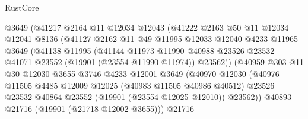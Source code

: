\begin{lexlean}{RustCore}
\begin{coremodule}
                          @3649
                          (@41217
                            @2164
                            @11
                            @12034
                            @12043
                            (@41222
                              @2163
                              @50
                              @11
                              @12034
                              @12041
                              @8136
                              (@41127
                                @2162
                                @11
                                @49
                                @11995
                                @12033
                                @12040
                                @4233
                                @11965
                                @3649
                                (@41138
                                  @11995
                                  (@41144
                                    @11973
                                    @11990
                                    @40988
                                    @23526
                                    @23532
                                    @41071
                                    @23552
                                    (@19901 (@23554 @11990 @11974))
                                    @23562))
                                (@40959
                                  @303
                                  @11
                                  @30
                                  @12030
                                  @3655
                                  @3746
                                  @4233
                                  @12001
                                  @3649
                                  (@40970
                                    @12030
                                    (@40976
                                      @11505
                                      @4485
                                      @12009
                                      @12025
                                      (@40983 @11505 @40986 @40512)
                                      @23526
                                      @23532
                                      @40864
                                      @23552
                                      (@19901 (@23554 @12025 @12010))
                                      @23562))
                                  @40893
                                  @21716
                                  (@19901 (@21718 @12002 @3655)))
                                @21716

\end{coremodule}
\end{lexlean}
